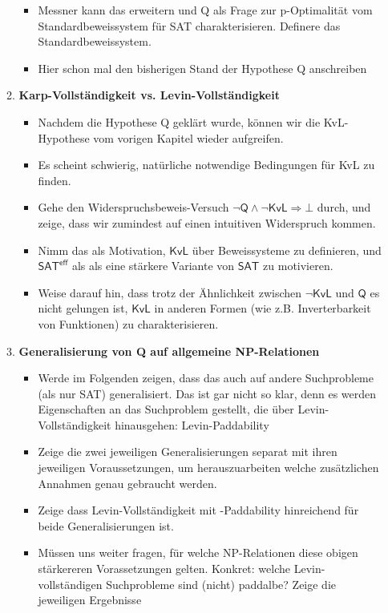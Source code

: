 \documentclass[nofonts]{uebung}
\begin{document}
\begin{enumerate}[label*=\arabic*.]
\begin{enumerate}[label*=\arabic*.]
\begin{itemize}
                \item Messner kann das erweitern und Q als Frage zur p-Optimalität vom Standardbeweissystem für SAT charakterisieren. Definere das Standardbeweissystem.
                \item Hier schon mal den bisherigen Stand der Hypothese Q anschreiben
            \end{itemize}
            \item \textbf{Karp-Vollständigkeit vs. Levin-Vollständigkeit}
            \begin{itemize}
                \item Nachdem die Hypothese Q geklärt wurde, können wir die KvL-Hypothese vom vorigen Kapitel wieder aufgreifen.
                \item Es scheint schwierig, natürliche notwendige Bedingungen für KvL zu finden. 
                \item Gehe den Widerspruchsbeweis-Versuch $\neg\mathsf{Q}\land \neg\mathsf{KvL}\Rightarrow\bot$ durch, und zeige, dass wir zumindest auf einen intuitiven Widerspruch kommen.
                \item Nimm das als Motivation, $\mathsf{KvL}$ über Beweissysteme zu definieren, und $\mathsf{SAT^{eff}}$ als als eine stärkere Variante von $\mathsf{SAT}$ zu motivieren.
                \item Weise darauf hin, dass trotz der Ähnlichkeit zwischen $\neg\mathsf{KvL}$ und $\mathsf{Q}$ es nicht gelungen ist, $\mathsf{KvL}$ in anderen Formen (wie z.B. Inverterbarkeit von Funktionen) zu charakterisieren.
            \end{itemize}
            \item \textbf{Generalisierung von Q auf allgemeine NP-Relationen}
            \begin{itemize}
                \item Werde im Folgenden zeigen, dass das auch auf andere Suchprobleme (als nur SAT) generalisiert. Das ist gar nicht so klar, denn es werden Eigenschaften an das Suchproblem gestellt, die über Levin-Vollständigkeit hinausgehen: Levin-Paddability
                \item Zeige die zwei jeweiligen Generalisierungen separat mit ihren jeweiligen Voraussetzungen, um herauszuarbeiten welche zusätzlichen Annahmen genau gebraucht werden.
                \item Zeige dass Levin-Vollständigkeit mit -Paddability hinreichend für beide Generalisierungen ist. 
                \item Müssen uns weiter fragen, für welche NP-Relationen diese obigen stärkereren Vorassetzungen gelten. Konkret: welche Levin-vollständigen Suchprobleme sind (nicht) paddalbe? Zeige die jeweiligen Ergebnisse

\end{itemize}
\end{enumerate}
\end{enumerate}
\end{document}
